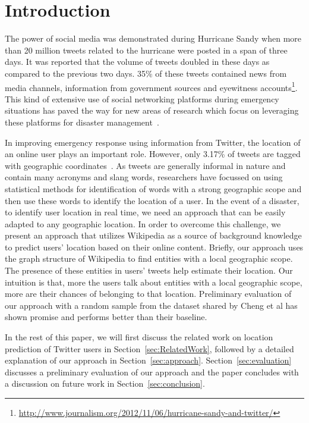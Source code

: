 \section{Introduction}
\label{sec:Introduction}

The power of social media was demonstrated during Hurricane Sandy when more than 20 million tweets related to the hurricane were posted in a span of three days. It was reported that the volume of tweets doubled in these days as compared to the previous two days. 35\% of these tweets contained news from media channels, information from government sources and eyewitness accounts\footnote{\url{http://www.journalism.org/2012/11/06/hurricane-sandy-and-twitter/}}. This kind of extensive use of social networking platforms during emergency situations has paved the way for new areas of research which focus on leveraging these platforms for disaster management~\cite{purohit2013emergency}. 

In improving emergency response using information from Twitter, the location of an online user plays an important role. However, only  3.17\% of tweets are tagged with geographic coordinates~\cite{morstatter2013sample}. As tweets are generally informal in nature and contain many acronyms and slang words, researchers have focussed on using statistical methods for identification of words with a strong geographic scope and then use these words to identify the location of a user.
In the event of a disaster, to identify user location in real time, we need an approach that can be easily adapted to any geographic location. In order to overcome this challenge, we present an approach that utilizes Wikipedia as a source of background knowledge to predict users' location based on their online content. Briefly, our approach uses the graph structure of Wikipedia to find entities with a local geographic scope. The presence of these entities in users' tweets help estimate their location. Our intuition is that, more the users talk about entities with a local geographic scope, more are their chances of belonging to that location. Preliminary evaluation of our approach with a random sample from the dataset shared by Cheng et al\cite{cheng2010you} has shown promise and performs better than their baseline.   

In the rest of this paper, we will first discuss the related work on location prediction of Twitter users in Section~\ref{sec:RelatedWork}, followed by a detailed explanation of our approach in Section~\ref{sec:approach}. Section~\ref{sec:evaluation} discusses a preliminary evaluation of our approach and the paper concludes with a discussion on future work in Section~\ref{sec:conclusion}. 